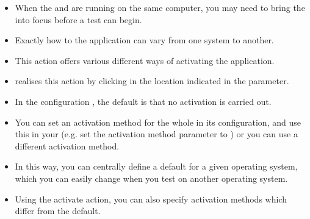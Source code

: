 \label{activate}
\begin{itemize}
\item When the \ite{} and \gdagent are running on the same computer, you may need to bring the \gdaut{} into focus before a test can begin.
\item Exactly how to  the application can vary from one system to another.
\item This action offers various different ways of activating the application.
\item \app{} realises this action by clicking in the location indicated in the  parameter.
\item In the \gdaut{} configuration , the default is that no activation is carried out. 
\item You can set an activation method for the whole \gdaut{} in  its configuration, and use this in your \gdsteps{} (e.g. set the activation method parameter to ) or you can use a different activation method.
\item In this way, you can centrally define a default for a given operating system, which you can easily change when you test on another operating system.
\item Using the activate action, you can also specify activation methods which differ from the default.

 
\end{itemize}



  
